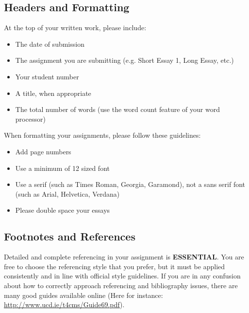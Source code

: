 
\subsection*{Headers and Formatting}

At the top of your written work, please include:

\begin{itemize}
	\item The date of submission
	\item The assignment you are submitting (e.g. Short Essay 1, Long Essay, etc.)
	\item Your student number
	\item A title, when appropriate
	\item The total number of words (use the word count feature of your word processor)
\end{itemize}

When formatting your assignments, please follow these guidelines:

\begin{itemize}
	\item Add page numbers
	\item Use a minimum of 12 sized font
	\item Use a serif (such as Times Roman, Georgia, Garamond), not a sans serif font (such as Arial, Helvetica, Verdana)
	\item Please double space your essays
\end{itemize}

\subsection*{Footnotes and References}

	Detailed and complete referencing in your assignment is \textbf{ESSENTIAL}. You are free to choose the referencing style that you prefer, but it must be applied consistently and in line with official style guidelines. If you are in any confusion about how to correctly approach referencing and bibliography issues, there are many good guides available online (Here for instance: \url{http://www.ucd.ie/t4cms/Guide69.pdf}).